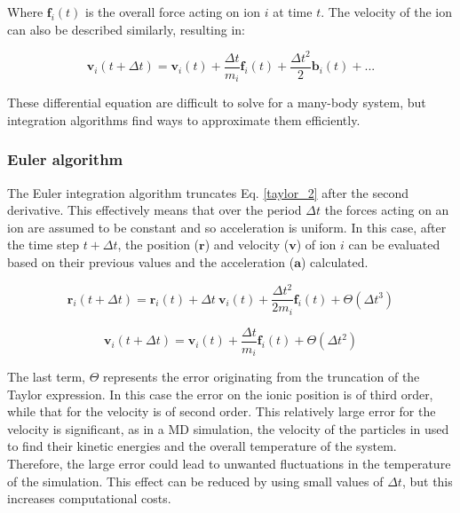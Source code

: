 \documentclass[12pt]{report}
\begin{document}
\noindent
Where $\textbf{f}_i(t)$ is the overall force acting on ion $i$ at time $t$.
The velocity of the ion can also be described similarly, resulting in:

\begin{equation}
    \textbf{v}_i(t + \Delta t) = \textbf{v}_i(t) + \frac{\Delta t}{m_i} \textbf{f}_i(t) + \frac{\Delta t^2}{2} \textbf{b}_i(t) + ...
\end{equation}

\noindent
These differential equation are difficult to solve for a many-body system, but integration algorithms find ways to approximate them efficiently.

\subsubsection{Euler algorithm}

The Euler integration algorithm truncates Eq. \ref{taylor_2} after the second derivative.
This effectively means that over the period $\Delta t$ the forces acting on an ion are assumed to be constant and so acceleration is uniform.
In this case, after the time step $t + \Delta t$, the position ($\textbf{r}$) and velocity ($\textbf{v}$) of ion $i$ can be evaluated based on their previous values and the acceleration ($\textbf{a}$) calculated.

\begin{equation}
    \textbf{r}_i(t + \Delta t) = \textbf{r}_i(t) + \Delta t \ \textbf{v}_i(t) + \frac{\Delta t^2}{2m_i} \textbf{f}_i(t) + \Theta (\Delta t^3)
\end{equation}

\begin{equation}
    \textbf{v}_i(t + \Delta t) = \textbf{v}_i(t) + \frac{\Delta t}{m_i} \textbf{f}_i(t) + \Theta (\Delta t^2)
\end{equation}

\noindent
The last term, $\Theta$ represents the error originating from the truncation of the Taylor expression. In this case the error on the ionic position is of third order, while that for the velocity is of second order.
This relatively large error for the velocity is significant, as in a MD simulation, the velocity of the particles in used to find their kinetic energies and the overall temperature of the system.
Therefore, the large error could lead to unwanted fluctuations in the temperature of the simulation.
This effect can be reduced by using small values of $\Delta t$, but this increases computational costs.
\end{document}
